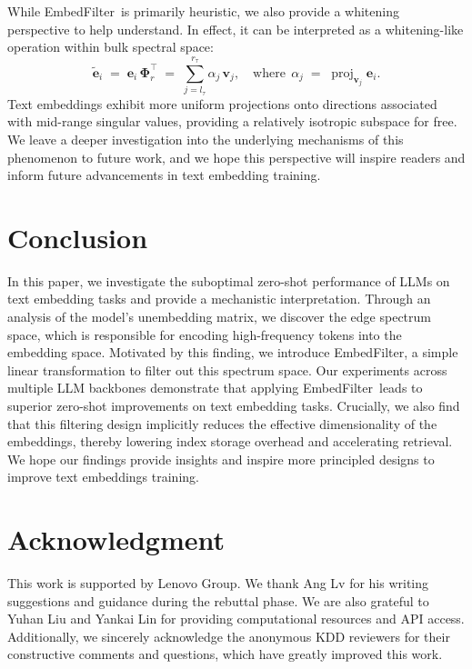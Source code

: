 \documentclass{llmxive}
\providecommand{\bm}[1]{\boldsymbol{#1}}
\providecommand{\name}{EmbedFilter}
\providecommand{\ve}{{\bm{e}}}
\providecommand{\vv}{{\bm{v}}}
\begin{document}
While \name\ is primarily heuristic, we also provide a whitening perspective to help understand. 
In effect, it can be interpreted as a whitening-like operation within bulk spectral space:
{\Large
\begin{equation*}
    \widetilde{\ve}_i \; = \; \ve_i \, \bm{\Phi}_r^\top \; = \; \sum_{j=l_\tau}^{r_\tau} \alpha_j \, \vv_j, \quad \text{where} \;\, \alpha_j \; = \; \operatorname{proj}_{\vv_j} \ve_i.
\end{equation*}
}
Text embeddings exhibit more uniform projections onto directions associated with mid-range singular values, providing a relatively isotropic subspace for free.
We leave a deeper investigation into the underlying mechanisms of this phenomenon to future work, and we hope this perspective will inspire readers and inform future advancements in text embedding training.

\section{Conclusion}
In this paper, we investigate the suboptimal zero-shot performance of LLMs on text embedding tasks and provide a mechanistic interpretation.
Through an analysis of the model's unembedding matrix, we discover the edge spectrum space, which is responsible for encoding high-frequency tokens into the embedding space.
Motivated by this finding, we introduce \name, a simple linear transformation to filter out this spectrum space.
Our experiments across multiple LLM backbones demonstrate that applying \name\ leads to superior zero-shot improvements on text embedding tasks. 
Crucially, we also find that this filtering design implicitly reduces the effective dimensionality of the embeddings, thereby lowering index storage overhead and accelerating retrieval.
We hope our findings provide insights and inspire more principled designs to improve text embeddings training.

\section*{Acknowledgment}
This work is supported by Lenovo Group.
We thank Ang Lv for his writing suggestions and guidance during the rebuttal phase. 
We are also grateful to Yuhan Liu and Yankai Lin for providing computational resources and API access. 
Additionally, we sincerely acknowledge the anonymous KDD reviewers for their constructive comments and questions, which have greatly improved this work.
\end{document}

